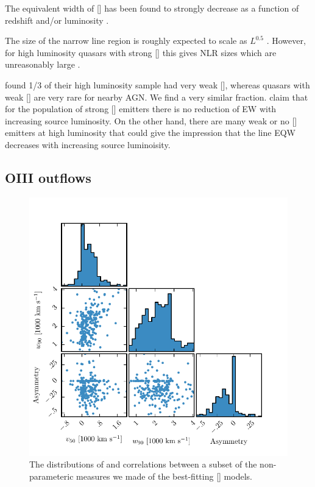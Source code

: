 The equivalent width of [] has been found to strongly decrease as a function of redshift and/or luminosity \citep[e.g.][]{brotherton96,netzer04,sulentic04,baskin05b}. 

The size of the narrow line region is roughly expected to scale as $L^{0.5}$ \citep[e.g.][]{netzer04}. 
However, for high luminosity quasars with strong [] this gives NLR sizes which are unreasonably large \citep[$\sim$100 kpc;][]{netzer04}. 

\citet{netzer04} found 1/3 of their high luminosity sample had very weak [], whereas quasars with weak [] are very rare for nearby AGN. 
We find a very similar fraction. 
\citet{netzer04} claim that for the population of strong [] emitters there is no reduction of EW with increasing source luminosity. 
On the other hand, there are many weak or no [] emitters at high luminosity that could give the impression that the line EQW decreases with increasing source luminoisity. 

\subsection{OIII outflows}

\begin{figure}
    \includegraphics[width=\columnwidth]{figures/chapter04/parameters_grid.pdf} 
    \caption{The distributions of and correlations between a subset of the non-parameteric measures we made of the best-fitting [] models.}     
    \label{fig:parameters_grid}
\end{figure}


